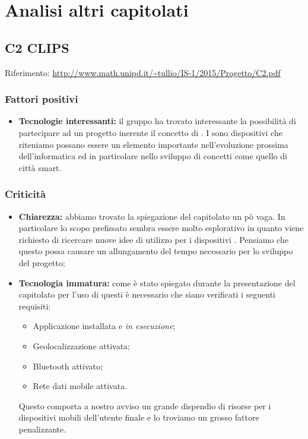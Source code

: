 \documentclass{scalatekids-article}
\begin{document}
\section{Analisi altri capitolati}
\subsection{C2 CLIPS}
Riferimento: \url{http://www.math.unipd.it/~tullio/IS-1/2015/Progetto/C2.pdf}\\
\subsubsection{Fattori positivi}
\begin{itemize}
\item \textbf{Tecnologie interessanti:} il gruppo ha trovato interessante la possibilità di partecipare ad un progetto inerente il concetto di .
I  sono dispositivi che riteniamo possano essere un elemento importante nell'evoluzione prossima dell'informatica ed in particolare nello sviluppo di concetti come quello di città smart.
\end{itemize}
\subsubsection{Criticità}
\begin{itemize}
\item \textbf{Chiarezza:} abbiamo trovato la spiegazione del capitolato un pò vaga.
In particolare lo scopo prefissato sembra essere molto esplorativo in quanto viene richiesto di ricercare nuove idee di utilizzo per i dispositivi . Pensiamo che questo possa causare un allungamento del tempo necessario per lo sviluppo del progetto;
\item \textbf{Tecnologia immatura:} come è stato spiegato durante la presentazione del capitolato per l'uso di questi  è necessario che siano verificati i seguenti requisiti:
  \begin{itemize}
  \item Applicazione installata e \textit{in esecuzione};
  \item Geolocalizzazione attivata;
  \item Bluetooth attivato;
  \item Rete dati mobile attivata.
  \end{itemize}
  Questo comporta a nostro avviso un grande dispendio di risorse per i dispositivi mobili dell'utente finale e lo troviamo un grosso fattore penalizzante.
\end{itemize}
\end{document}

